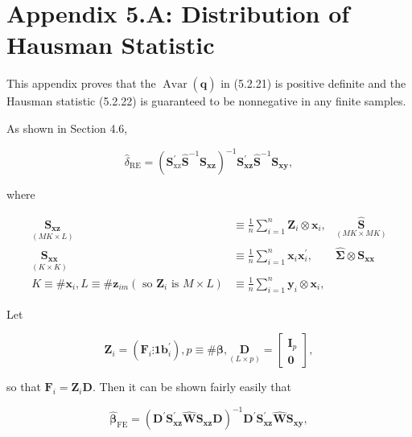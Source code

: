 \documentclass[10pt]{article}
\begin{document}
\section*{Appendix 5.A: Distribution of Hausman Statistic}
This appendix proves that the $\operatorname{Avar}(\hat{\mathbf{q}})$ in (5.2.21) is positive definite and the Hausman statistic (5.2.22) is guaranteed to be nonnegative in any finite samples.

As shown in Section 4.6,


\begin{equation*}
\hat{\delta}_{\mathrm{RE}}=\left(\mathbf{S}_{\mathrm{xz}}^{\prime} \widehat{\mathbf{S}}^{-1} \mathbf{S}_{\mathbf{x z}}\right)^{-1} \mathbf{S}_{\mathbf{x z}}^{\prime} \widehat{\mathbf{S}}^{-1} \mathbf{S}_{\mathbf{x y}}, \tag{5.A.1}
\end{equation*}


where

$$
\begin{array}{rlr}
\underset{(M K \times L)}{\mathbf{S}_{\mathbf{x z}}} & \equiv \frac{1}{n} \sum_{i=1}^{n} \mathbf{Z}_{i} \otimes \mathbf{x}_{i}, & \underset{(M K \times M K)}{\widehat{\mathbf{S}}} \\
\underset{(K \times K)}{\mathbf{S}_{\mathbf{x x}}} & \equiv \frac{1}{n} \sum_{i=1}^{n} \mathbf{x}_{i} \mathbf{x}_{i}^{\prime}, & \widehat{\mathbf{\Sigma}} \otimes \mathbf{S}_{\mathbf{x x}} \\
K \equiv \# \mathbf{x}_{i}, L \equiv \# \mathbf{z}_{i m}\left(\text { so } \mathbf{Z}_{i} \text { is } M \times L\right) & \equiv \frac{1}{n} \sum_{i=1}^{n} \mathbf{y}_{i} \otimes \mathbf{x}_{i},
\end{array}
$$

Let

$$
\mathbf{Z}_{i}=\left(\mathbf{F}_{i} \vdots \mathbf{1 b}_{i}^{\prime}\right), p \equiv \# \boldsymbol{\beta}, \underset{(L \times p)}{\mathbf{D}}=\left[\begin{array}{c}
\mathbf{I}_{p} \\
\mathbf{0}
\end{array}\right],
$$

so that $\mathbf{F}_{i}=\mathbf{Z}_{i} \mathbf{D}$. Then it can be shown fairly easily that


\begin{equation*}
\widehat{\boldsymbol{\beta}}_{\mathrm{FE}}=\left(\mathbf{D}^{\prime} \mathbf{S}_{\mathbf{x z}}^{\prime} \widehat{\mathbf{W}} \mathbf{S}_{\mathbf{x z}} \mathbf{D}\right)^{-1} \mathbf{D}^{\prime} \mathbf{S}_{\mathbf{x z}}^{\prime} \widehat{\mathbf{W}} \mathbf{S}_{\mathbf{x y}}, \tag{5.A.2}
\end{equation*}
\end{document}
